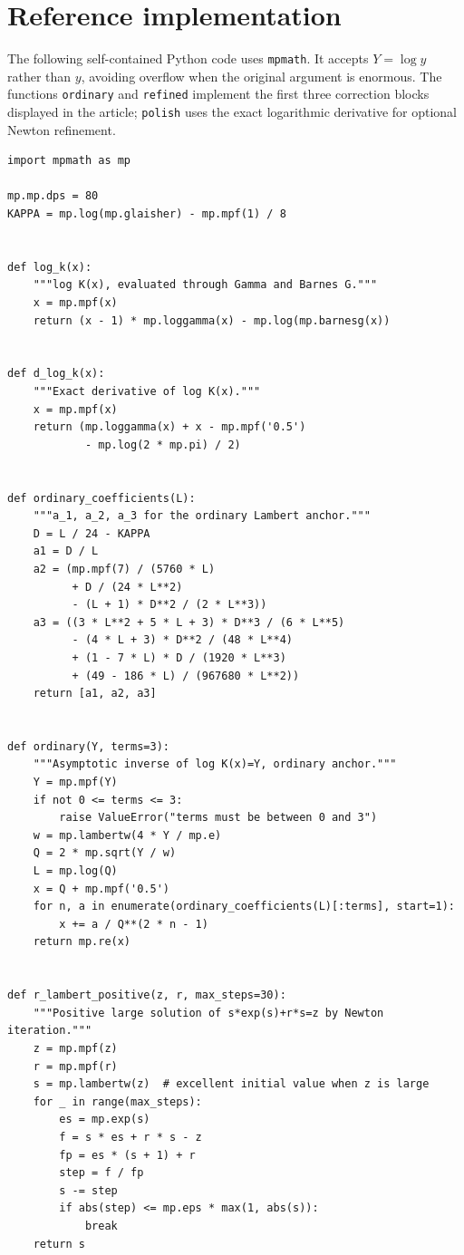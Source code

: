 \documentclass[11pt,oneside]{article}
\theoremstyle{plain}
\theoremstyle{definition}
\theoremstyle{remark}
\begin{document}
\section{Reference implementation}
\label{app:code}

The following self-contained Python code uses \texttt{mpmath}.  It accepts
\(Y=\log y\) rather than \(y\), avoiding overflow when the original argument
is enormous.  The functions \texttt{ordinary} and \texttt{refined} implement
the first three correction blocks displayed in the article; \texttt{polish}
uses the exact logarithmic derivative for optional Newton refinement.

\begin{lstlisting}
import mpmath as mp

mp.mp.dps = 80
KAPPA = mp.log(mp.glaisher) - mp.mpf(1) / 8


def log_k(x):
    """log K(x), evaluated through Gamma and Barnes G."""
    x = mp.mpf(x)
    return (x - 1) * mp.loggamma(x) - mp.log(mp.barnesg(x))


def d_log_k(x):
    """Exact derivative of log K(x)."""
    x = mp.mpf(x)
    return (mp.loggamma(x) + x - mp.mpf('0.5')
            - mp.log(2 * mp.pi) / 2)


def ordinary_coefficients(L):
    """a_1, a_2, a_3 for the ordinary Lambert anchor."""
    D = L / 24 - KAPPA
    a1 = D / L
    a2 = (mp.mpf(7) / (5760 * L)
          + D / (24 * L**2)
          - (L + 1) * D**2 / (2 * L**3))
    a3 = ((3 * L**2 + 5 * L + 3) * D**3 / (6 * L**5)
          - (4 * L + 3) * D**2 / (48 * L**4)
          + (1 - 7 * L) * D / (1920 * L**3)
          + (49 - 186 * L) / (967680 * L**2))
    return [a1, a2, a3]


def ordinary(Y, terms=3):
    """Asymptotic inverse of log K(x)=Y, ordinary anchor."""
    Y = mp.mpf(Y)
    if not 0 <= terms <= 3:
        raise ValueError("terms must be between 0 and 3")
    w = mp.lambertw(4 * Y / mp.e)
    Q = 2 * mp.sqrt(Y / w)
    L = mp.log(Q)
    x = Q + mp.mpf('0.5')
    for n, a in enumerate(ordinary_coefficients(L)[:terms], start=1):
        x += a / Q**(2 * n - 1)
    return mp.re(x)


def r_lambert_positive(z, r, max_steps=30):
    """Positive large solution of s*exp(s)+r*s=z by Newton iteration."""
    z = mp.mpf(z)
    r = mp.mpf(r)
    s = mp.lambertw(z)  # excellent initial value when z is large
    for _ in range(max_steps):
        es = mp.exp(s)
        f = s * es + r * s - z
        fp = es * (s + 1) + r
        step = f / fp
        s -= step
        if abs(step) <= mp.eps * max(1, abs(s)):
            break
    return s



\end{lstlisting}
\end{document}
